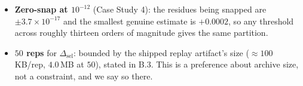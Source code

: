 \documentclass[10pt]{article} %
\begin{document}
\begin{itemize}
  \texttt{code/50}'s corrected $K$-law fit, precisely so that a threshold is
  not re-picked after seeing which cells it removes. On Sweep A no cell sits
  near it: retained cells are at $\leq0.36$, excluded cells at $\geq0.65$.
\item \textbf{Zero-snap at $10^{-12}$} (Case Study 4): the residues being
  snapped are $\pm3.7\times10^{-17}$ and the smallest genuine estimate is
  $+0.0002$, so any threshold across roughly thirteen orders of magnitude gives
  the same partition.
\item \textbf{$50$ reps} for $\Delta_{\text{sel}}$: bounded by the shipped
  replay artifact's size ($\approx$$100$\,KB/rep, $4.0$\,MB at $50$), stated in
  B.3. This is a preference about archive size, not a constraint, and we say so
  there.
\end{itemize}
\end{document}
